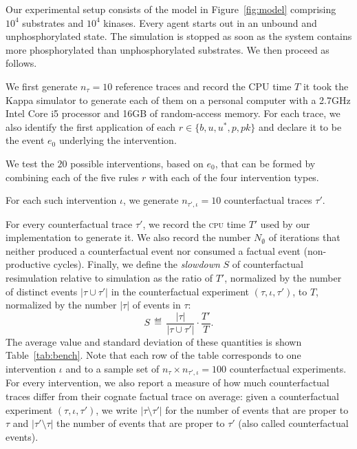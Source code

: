 Our experimental setup consists of the model in Figure~\ref{fig:model} comprising $10^4$ substrates and $10^4$ kinases. Every agent starts out in an unbound and unphosphorylated state. The simulation is stopped as soon as the system contains more phosphorylated than unphosphorylated substrates. We then proceed as follows.
\begin{inparaenum}[(i)]
\item We first generate $n_{\tau}=10$ reference traces and record the
  CPU time $T$ it took the Kappa simulator to generate each of them on
  a personal computer with a 2.7GHz Intel Core i5 processor and 16GB
  of random-access memory.  For each trace, we also identify the first
  application of each $r\in\{b,u,u^{\ast},p,pk\}$ and declare it to be
  the event $e_0$ underlying the intervention.
\item We test the $20$ possible interventions, based on $e_0$, that
  can be formed by combining each of the five rules $r$ with each of
  the four intervention types.
\item For each such intervention $\iota$, we generate
  $n_{\tau',\iota} = 10$ counterfactual traces $\tau'$.
\item For every counterfactual trace $\tau'$, we record the
  \textsc{cpu} time $T'$ used by our implementation to generate it. We
  also record the number $N_{\emptyset}$ of iterations that neither
  produced a counterfactual event nor consumed a factual event
  (non-productive cycles).  Finally, we define the \textit{slowdown}
  $S$ of counterfactual resimulation relative to simulation as the
  ratio of $T'$, normalized by the number of distinct events
  $|\tau \cup \tau'|$ in the counterfactual experiment
  $(\tau, \iota, \tau')$, to $T$, normalized by the number $|\tau|$ of
  events in $\tau$:
  \[
    S \,\eqdef\, \frac{|\tau|}{|\tau \cup \tau'|} \cdot\frac{T'}{T}.
  \]
  The average value and standard deviation of these quantities is
  shown Table~\ref{tab:bench}. Note that each row of the table
  corresponds to one intervention $\iota$ and to a sample set of
  $n_{\tau} \times n_{\tau',\iota} = 100$ counterfactual
  experiments. For every intervention, we also report a measure of how
  much counterfactual traces differ from their cognate factual trace
  on average: given a counterfactual experiment
  $(\tau, \iota, \tau')$, we write $|\tau \!\setminus\! \tau'|$ for
  the number of events that are proper to $\tau$ and
  $|\tau' \!\setminus\! \tau|$ the number of events that are proper to
  $\tau'$ (also called counterfactual events).
\end{inparaenum}

